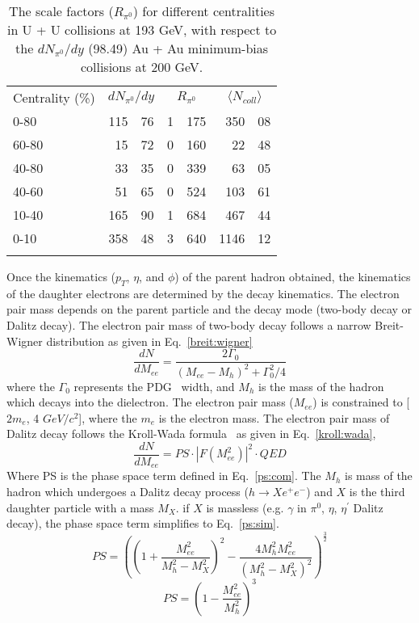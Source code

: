 \begin{table}[htp]
\centering
\caption{The scale factors ($R_{\pi^{0}}$) for different centralities in U + U collisions at 193 GeV, with respect to the $dN_{\pi^{0}}/dy$ (98.49) Au + Au minimum-bias collisions at 200 GeV.}
\label{uupi0}
\begin{tabular}{lr@{.}lr@{.}lr@{.}l}
\Xhline{1.6pt}
Centrality (\%) & \multicolumn{2}{c}{$dN_{\pi^{0}}/dy$} & \multicolumn{2}{c}{$R_{\pi^{0}}$} & \multicolumn{2}{c}{$\langle$$N_{coll}$$\rangle$} \\
\Xhline{1.2pt}
 0-80 & 115&76 & 1&175 & 350&08 \\
 60-80 & 15&72 & 0&160 & 22&48  \\
 40-80 & 33&35 & 0&339 & 63&05  \\
 40-60 & 51&65 & 0&524 & 103&61 \\
 10-40 & 165&90 & 1&684 & 467&44 \\
 0-10 & 358&48 & 3&640 & 1146&12 \\
\Xhline{1.6pt}
\end{tabular}
\end{table}

Once the kinematics ($p_{T}$, $\eta$, and $\phi$) of the parent hadron obtained, the kinematics of the daughter electrons are determined by the decay kinematics. The electron pair mass depends on the parent particle and the decay mode (two-body decay or Dalitz decay). The electron pair mass of two-body decay follows a narrow Breit-Wigner distribution as given in Eq.~\ref{breit:wigner}
\begin{equation}
\frac{dN}{dM_{ee}} = \frac{2\Gamma_{0}}{(M_{ee} - M_{h})^{2} + \Gamma_{0}^{2}/4}
\label{breit:wigner}
\end{equation}
where the $\Gamma_{0}$ represents the PDG~\cite{PDG} width, and $M_{h}$ is the mass of the hadron which decays into the dielectron. The electron pair mass ($M_{ee}$) is constrained to [$2m_{e}$, 4 $GeV/c^{2}$], where the $m_{e}$ is the electron mass. The electron pair mass of Dalitz decay follows the Kroll-Wada formula~\cite{KrollWada} as given in Eq.~\ref{kroll:wada}, 
\begin{equation}
\frac{dN}{dM_{ee}} = PS \cdot |F(M_{ee}^{2})|^{2} \cdot QED
\label{kroll:wada}
\end{equation}
Where PS is the phase space term defined in Eq.~\ref{ps:com}. The $M_{h}$ is mass of the hadron which undergoes a Dalitz decay process ($h \rightarrow Xe^{+}e^{-}$) and $X$ is the third daughter particle with a mass $M_{X}$. if $X$ is massless (e.g. $\gamma$ in $\pi^{0}$, $\eta$, $\eta^{\prime}$ Dalitz decay), the phase space term simplifies to Eq.~\ref{ps:sim}.
\begin{equation}
PS =  \left( (1 + \frac{M_{ee}^{2}}{M_{h}^{2} - M_{X}^{2}})^{2} - \frac{4M_{h}^{2}M_{ee}^{2}}{(M_{h}^{2}-M_{X}^{2})^{2}} \right)^{\frac{3}{2}}
\label{ps:com}
\end{equation}
\begin{equation}
PS =  \left( 1- \frac{M_{ee}^{2}}{M_{h}^{2}} \right)^{3}
\label{ps:sim}
\end{equation}

